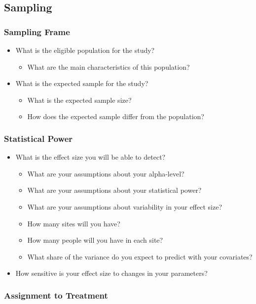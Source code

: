 \documentclass[12pt]{article}
\begin{document}
\subsection{Sampling}

\subsubsection{Sampling Frame}

\begin{itemize}
\item What is the eligible population for the study?
\begin{itemize}
\item What are the main characteristics of this population?
\end{itemize}
\item What is the expected sample for the study?
\begin{itemize}
\item What is the expected sample size?
\item How does the expected sample differ from the population?
\end{itemize}
\end{itemize}

\subsubsection{Statistical Power}

\begin{itemize}
\item What is the effect size you will be able to detect?
\begin{itemize} 
\item What are your assumptions about your alpha-level?
\item What are your assumptions about your statistical power?
\item What are your assumptions about variability in your effect size?
\item How many sites will you have?
\item How many people will you have in each site?
\item What share of the variance do you expect to predict with your covariates?
\end{itemize}
\item How sensitive is your effect size to changes in your parameters?
\end{itemize}

\subsubsection{Assignment to Treatment}
\end{document}
